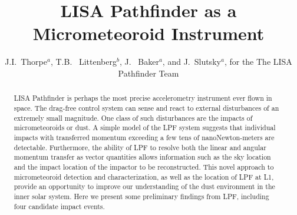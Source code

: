 \documentclass[a4paper]{jpconf}
\begin{document}
\title{LISA Pathfinder as a Micrometeoroid Instrument}

\author{
J.I.~Thorpe$^{a}$,
T.B. ~Littenberg$^{b}$,
J. ~Baker$^{a}$,
and J.~Slutsky$^{a}$,
for the The LISA Pathfinder Team
}
\address{$^{s}$ NASA Goddard Space Flight Center, 8800 Greenbelt Road, Greenbelt, MD 20771, USA}
\address{$^{u}$ NASA Marshall Space Flight Center, Redstone Arsenal, Huntsville, AL 35812, USA}



\begin{abstract}
LISA Pathfinder is perhaps the most precise accelerometry instrument ever flown in space. The drag-free control system can sense and react to external disturbances of an extremely small magnitude. One class of such disturbances are the impacts of micrometeoroids or dust. A simple model of the LPF system suggests that individual impacts with transferred momentum exceeding a few tens of nanoNewton-meters are detectable. Furthermore, the ability of LPF to resolve both the linear and angular momentum transfer as vector quantities allows information such as the sky location and the impact location of the impactor to be reconstructed. This novel approach to micrometeoroid detection and characterization, as well as the location of LPF at L1, provide an opportunity to improve our understanding of the dust environment in the inner solar system. Here we present some preliminary findings from LPF, including four candidate impact events.
\end{abstract}

\end{document}
